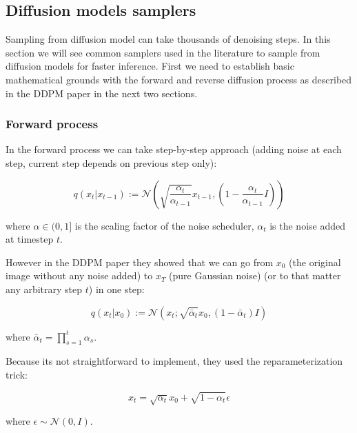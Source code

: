 \subsection{Diffusion models samplers}
\label{appendix:dm_samplers}

Sampling from diffusion model can take thousands of denoising steps. In this section we will see common samplers used in the literature to sample from diffusion models for faster inference. First we need to establish basic mathematical grounds with the forward and reverse diffusion process as described in the DDPM paper \cite{ddpm} in the next two sections.








\subsubsection*{Forward process}

In the forward process we can take step-by-step approach (adding noise at each step, current step depends on previous step only):

\[ q(x_t | x_{t-1}) := \mathcal{N} \left( \sqrt{\frac{\alpha_t}{\alpha_{t-1}}} x_{t-1}, \left( 1 - \frac{\alpha_t}{\alpha_{t-1}} I \right) \right) \]

where $\alpha \in (0, 1]$ is the scaling factor of the noise scheduler, $\alpha_t$ is the noise added at timestep $t$.

However in the DDPM paper \cite{ddpm} they showed that we can go from $x_0$ (the original image without any noise added) to $x_T$ (pure Gaussian noise) (or to that matter any arbitrary step $t$) in one step:

\[ q(x_t | x_0) := \mathcal{N} \left( x_t; \sqrt{\bar{\alpha}_t} x_0, (1 - \bar{\alpha}_t) I \right) \]

where $\bar{\alpha}_t = \prod_{s=1}^{t} \alpha_s$.

Because its not straightforward to implement, they used the reparameterization trick:

\begin{equation}
    x_t = \sqrt{\alpha_t} x_0 + \sqrt{1 - \alpha_t} \epsilon
    \label{eq:appendix_ddpm_reparam_trick}
\end{equation}

where $\epsilon \sim \mathcal{N} (0, I)$. 








